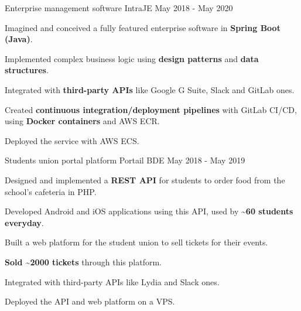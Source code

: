 

\begin{cventries}

  \cventry
    {Enterprise management software} %
    {IntraJE} %
    {} %
    {May 2018 - May 2020} %
    {
      \begin{cvitems} %
        \item {Imagined and conceived a fully featured enterprise software in \textbf{Spring Boot (Java)}.}
        \item {Implemented complex business logic using \textbf{design patterns} and \textbf{data structures}.}
        \item {Integrated with \textbf{third-party APIs} like Google G Suite, Slack and GitLab ones.}
        \item {Created \textbf{continuous integration/deployment pipelines} with GitLab CI/CD, using \textbf{Docker containers} and AWS ECR.}
        \item {Deployed the service with AWS ECS.}
      \end{cvitems}
    }
  \cventry
    {Students union portal platform} %
    {Portail BDE} %
    {} %
    {May 2018 - May 2019} %
    {
      \begin{cvitems} %
        \item {Designed and implemented a \textbf{REST API} for students to order food from the school's cafeteria in PHP.}
        \item {Developed Android and iOS applications using this API, used by \textbf{\textasciitilde60 students everyday}.}
        \item {Built a web platform for the student union to sell tickets for their events.}
        \item {\textbf{Sold \textasciitilde2000 tickets} through this platform.}
        \item {Integrated with third-party APIs like Lydia and Slack ones.}
        \item {Deployed the API and web platform on a VPS.}
      \end{cvitems}
    }

\end{cventries}
